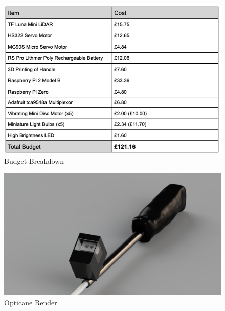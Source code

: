 \documentclass{article}
\begin{document}
\begin{figure}[tb]
\vskip 5mm
\begin{center}
\centerline{\includegraphics[width=\columnwidth]{figs/budget-breakdown}}
\caption{Budget Breakdown}
\label{fig:budget-fig}
\end{center}
\vskip -5mm
\end{figure}

\begin{figure}[tb]
\vskip 5mm
\begin{center}
\centerline{\includegraphics[width=\columnwidth]{figs/handle-render}}
\caption{Opticane Render}
\label{fig:render}
\end{center}
\vskip -5mm
\end{figure}
\end{document}
